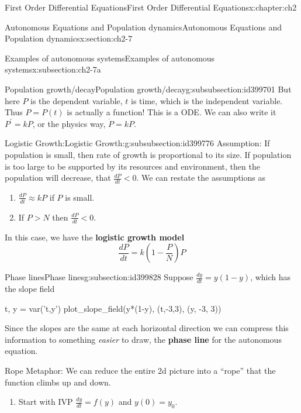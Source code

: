 \documentclass[oneside,10pt,]{book}
\newcommand{\terminology}[1]{\textbf{#1}}
\numberwithin{equation}{section}
\numberwithin{equation}{section}
\newcommand{\lt}{<}
\begin{document}
\begin{chapterptx}{First Order Differential Equations}{}{First Order Differential Equations}{}{}{x:chapter:ch2}
\begin{sectionptx}{Autonomous Equations and Population dynamics}{}{Autonomous Equations and Population dynamics}{}{}{x:section:ch2-7}
\begin{subsectionptx}{Examples of autonomous systems}{}{Examples of autonomous systems}{}{}{x:subsection:ch2-7a}
\begin{subsubsectionptx}{Population growth\slash{}decay}{}{Population growth\slash{}decay}{}{}{g:subsubsection:id399701}
But here \(P\) is the dependent variable, \(t\) is time, which is the independent variable. Thus \(P=P(t)\) is actually a function! This is a ODE. We can also write it \(P^{\prime}=kP\), or the physics way, \(\dot{P}=kP\).%
\end{subsubsectionptx}
%
%
\typeout{************************************************}
\typeout{************************************************}
%
\begin{subsubsectionptx}{Logistic Growth:}{}{Logistic Growth:}{}{}{g:subsubsection:id399776}
Assumption: If population is small, then rate of growth is proportional to its size. If population is too large to be supported by its resources and environment, then the population will decrease, that \(\frac{dP}{dt} \lt 0\). We can restate the assumptions as%
\begin{enumerate}
\item{}\(\frac{dP}{dt}\approx kP\) if \(P\) is small.%
\item{}If \(P>N\) then \(\frac{dP}{dt} \lt 0\).%
\end{enumerate}
%
\par
In this case, we have the \terminology{logistic growth model}%
\begin{equation*}
\frac{dP}{dt}=k\left(1-\frac{P}{N}\right)P
\end{equation*}
%
\end{subsubsectionptx}
\end{subsectionptx}
%
%
\typeout{************************************************}
\typeout{************************************************}
%
\begin{subsectionptx}{Phase lines}{}{Phase lines}{}{}{g:subsection:id399828}
Suppose \(\frac{dy}{dt}=y(1-y)\), which has the slope field \begin{sageinput}
t, y = var('t,y')
plot_slope_field(y*(1-y), (t,-3,3), (y, -3, 3))
\end{sageinput}
%
\par
Since the slopes are the same at each horizontal direction we can compress this information to something \emph{easier} to draw, the \terminology{phase line} for the autonomous equation.%
\par
Rope Metaphor: We can reduce the entire 2d picture into a ``rope'' that the function climbs up and down.%
\begin{enumerate}
\item{}Start with IVP \(\frac{dy}{dt}=f(y)\) and \(y(0)=y_{0}\).%

\end{enumerate}
\end{subsectionptx}
\end{sectionptx}
\end{chapterptx}
\end{document}
